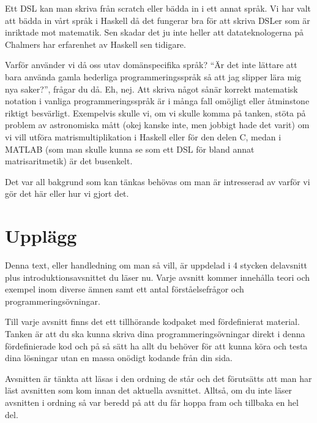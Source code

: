 \documentclass{article}
\begin{document}
Ett DSL kan man skriva från scratch eller bädda in i ett annat språk.
Vi har valt att bädda in vårt språk i Haskell då det fungerar bra för att
skriva DSLer som är inriktade mot matematik. Sen skadar det ju inte heller
att datateknologerna på Chalmers har erfarenhet av Haskell sen tidigare.

Varför använder vi då oss utav domänspecifika språk? “Är det inte lättare
att bara använda gamla hederliga programmeringsspråk så att jag slipper lära
mig nya saker?”, frågar du då. Eh, nej.
Att skriva något sånär korrekt matematisk notation i vanliga
programmeringsspråk är i många fall omöjligt eller åtminstone riktigt besvärligt.
Exempelvis skulle vi, om vi skulle komma på tanken, stöta på problem av
astronomiska mått (okej kanske inte, men jobbigt hade det varit) om vi vill
utföra matrismultiplikation i Haskell eller för den delen C,
medan i MATLAB (som man skulle kunna se som ett DSL för bland annat
matrisaritmetik) är det busenkelt.

Det var all bakgrund som kan tänkas behövas om man är intresserad av varför
vi gör det här eller hur vi gjort det.

\newpage

\section{Upplägg}
Denna text, eller handledning om man så vill, är uppdelad i 4 stycken delavsnitt
plus introduktionsavsnittet du läser nu. Varje avsnitt kommer innehålla teori
och exempel inom diverse ämnen samt ett antal förståelsefrågor och
programmeringsövningar.

Till varje avsnitt finns det ett tillhörande kodpaket med fördefinierat material.
Tanken är att du ska kunna skriva dina programmeringsövningar direkt i denna
fördefinierade kod och på så sätt ha allt du behöver för att kunna köra och
testa dina lösningar utan en massa onödigt kodande från din sida.

Avsnitten är tänkta att läsas i den ordning de står och det förutsätts att man
har läst avsnitten som kom innan det aktuella avsnittet.
Alltså, om du inte läser avsnitten i ordning så var beredd på att du
får hoppa fram och tillbaka en hel del.
\end{document}
